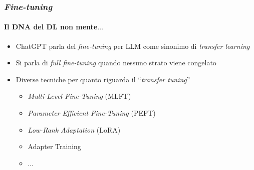 %
\begin{frame}[t] \frametitle{\emph{Fine-tuning}}
\framesubtitle{Il DNA del DL non mente$\ldots$}
{\small
{}
    \begin{minipage}[t]{\textwidth}
        \begin{itemize}[leftmargin=10pt,align=right]
            \item[\alert{\faArrowCircleRight}] ChatGPT parla del \emph{fine-tuning} per LLM come sinonimo di \emph{transfer learning}
            \item[\alert{\faArrowCircleRight}] Si parla di \emph{\alert{full fine-tuning}} quando nessuno strato viene congelato
            \item[\alert{\faArrowCircleRight}] Diverse tecniche per quanto riguarda il ``\emph{transfer tuning}''
            \begin{itemize}[leftmargin=10pt,align=right]
            \item[\alert{\faArrowCircleRight}] \emph{\alert{M}ulti-\alert{L}evel \alert{F}ine-\alert{T}uning} (MLFT)
            \item[\alert{\faArrowCircleRight}] \emph{\alert{P}arameter \alert{E}fficient \alert{F}ine-\alert{T}uning} (PEFT)
            \item[\alert{\faArrowCircleRight}] \alert{\emph{\alert{Lo}w-\alert{R}ank \alert{A}daptation} (LoRA)}
            \item[\alert{\faArrowCircleRight}] Adapter Training
            \item[\alert{\faArrowCircleRight}] $\ldots$
            \end{itemize}
        \end{itemize}
    \end{minipage}
}
\end{frame}
%
